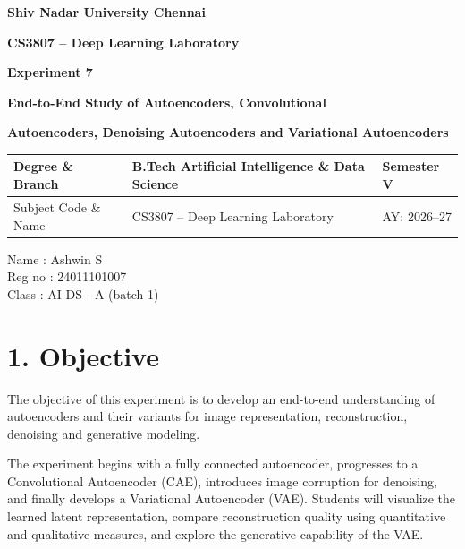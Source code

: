 \documentclass[10pt]{article}
\begin{document}

\begin{center}

{\large\textbf{Shiv Nadar University Chennai}}

\vspace{2mm}

{\normalsize\textbf{CS3807 -- Deep Learning Laboratory}}

\vspace{2mm}

{\large\textbf{Experiment 7}}

\vspace{1mm}

{\normalsize\textbf{End-to-End Study of Autoencoders, Convolutional}}

{\normalsize\textbf{Autoencoders, Denoising Autoencoders and Variational Autoencoders}}

\end{center}

\vspace{3mm}

\begin{tabular}{|p{3.4cm}|p{9.0cm}|p{1.4cm}|}
\hline
Degree \& Branch &
B.Tech Artificial Intelligence \& Data Science &
Semester V\\
\hline
Subject Code \& Name &
CS3807 -- Deep Learning Laboratory &
AY: 2026--27\\
\hline
\end{tabular}

\vspace{4mm}
Name : Ashwin S\\
Reg no : 24011101007\\
Class : AI DS - A (batch 1)\\

\section*{1. Objective}

The objective of this experiment is to develop an end-to-end understanding of
autoencoders and their variants for image representation, reconstruction,
denoising and generative modeling.

The experiment begins with a fully connected autoencoder, progresses to a
Convolutional Autoencoder (CAE), introduces image corruption for denoising,
and finally develops a Variational Autoencoder (VAE). Students will visualize
the learned latent representation, compare reconstruction quality using
quantitative and qualitative measures, and explore the generative capability
of the VAE.
\end{document}
